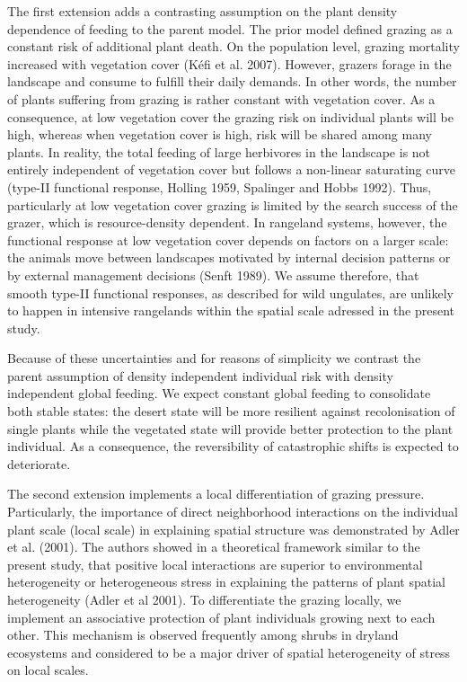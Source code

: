 The first extension adds a contrasting assumption on the plant density dependence of feeding to the parent model. The prior model defined grazing as a constant risk of additional plant death. On the population level, grazing mortality increased with vegetation cover (K\'efi et al. 2007). However, grazers forage in the landscape and consume to fulfill their daily demands. In other words, the number of plants suffering from grazing is rather constant with vegetation cover. As a consequence, at low vegetation cover the grazing risk on individual plants will be high, whereas when vegetation cover is high, risk will be shared among many plants.
In reality, the total feeding of large herbivores in the landscape is not entirely independent of vegetation cover but follows a non-linear saturating curve (type-II functional response, Holling 1959, Spalinger and Hobbs 1992). Thus, particularly at low vegetation cover grazing is limited by the search success of the grazer, which is resource-density dependent. In rangeland systems, however, the functional response at low vegetation cover depends on factors on a larger scale: the animals move between landscapes motivated by internal decision patterns or by external management decisions (Senft 1989). We assume therefore, that smooth type-II functional responses, as described for wild ungulates, are unlikely to happen in intensive rangelands within the spatial scale adressed in the present study.

Because of these uncertainties and for reasons of simplicity we contrast the parent assumption of density independent individual risk with density independent global feeding. We expect constant global feeding to consolidate both stable states: the desert state will be more resilient against recolonisation of single plants while the vegetated state will provide better protection to the plant individual. As a consequence, the reversibility of catastrophic shifts is expected to deteriorate. 


The second extension implements a local differentiation of grazing pressure. %
Particularly, the importance of direct neighborhood interactions on the individual plant scale (local scale) in explaining spatial structure was demonstrated by Adler et al. (2001). The authors showed in a theoretical framework similar to the present study, that positive local interactions are superior to environmental heterogeneity or heterogeneous stress in explaining the patterns of plant spatial heterogeneity (Adler et al 2001). 
To differentiate the grazing locally, we implement an associative protection of plant individuals growing next to each other. This mechanism is observed frequently among shrubs in dryland ecosystems and considered to be a major driver of spatial heterogeneity of stress on local scales. 


